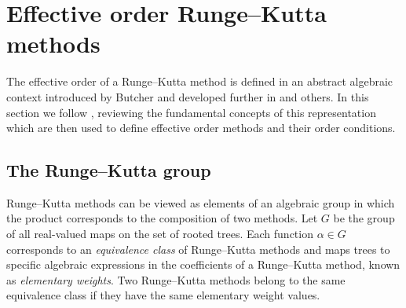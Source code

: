 \section{Effective order Runge--Kutta methods}\label{sec:Algebraic_RK}
The effective order of a Runge--Kutta method is defined in an abstract 
algebraic context introduced by Butcher \cite{Butcher1969} and developed 
further in \cite{Butcher1972, Hairer1974, Butcher1996, Butcher1998} and 
others.
In this section we follow \cite{Butcher2008_book}, reviewing the 
fundamental concepts of this representation which are then used to 
define effective order methods and their order conditions.

\subsection{The Runge--Kutta group}\label{sec:RK_group}

Runge--Kutta methods can be viewed as elements of an algebraic group
in which the product corresponds to the composition of two methods.
Let $G$ be the group of all real-valued maps on the set
of rooted trees.
Each function $\alpha \in G$ corresponds
to an \emph{equivalence class} of Runge--Kutta methods and maps trees to specific
algebraic expressions in the coefficients
of a Runge--Kutta method, known as \emph{elementary weights}.
Two Runge--Kutta methods belong to the same equivalence class 
if they have the same elementary weight values.

